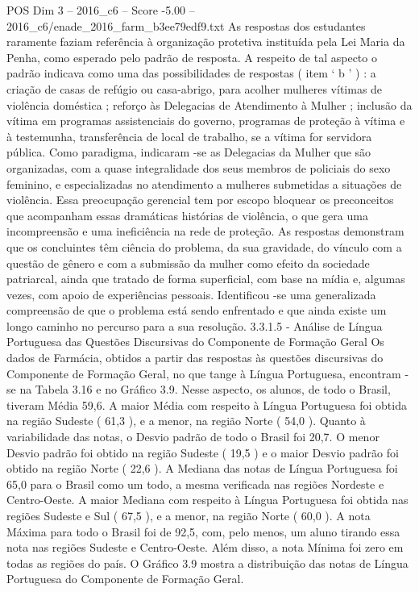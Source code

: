\begin{textsample}{POS Dim 3 – 2016\_c6 – Score -5.00 – 2016\_c6/enade\_2016\_farm\_b3ee79edf9.txt}
As respostas dos estudantes raramente faziam referência à organização protetiva instituída pela Lei Maria da Penha, como esperado pelo padrão de resposta.
A respeito de tal aspecto o padrão indicava como uma das possibilidades de respostas ( item ‘ b ’ ) : a criação de casas de refúgio ou casa-abrigo, para acolher mulheres vítimas de violência doméstica ; reforço às Delegacias de Atendimento à Mulher ; inclusão da vítima em programas assistenciais do governo, programas de proteção à vítima e à testemunha, transferência de local de trabalho, se a vítima for servidora pública.
Como paradigma, indicaram -se as Delegacias da Mulher que são organizadas, com a quase integralidade dos seus membros de policiais do sexo feminino, e especializadas no atendimento a mulheres submetidas a situações de violência.
Essa preocupação gerencial tem por escopo bloquear os preconceitos que acompanham essas dramáticas histórias de violência, o que gera uma incompreensão e uma ineficiência na rede de proteção.
As respostas demonstram que os concluintes têm ciência do problema, da sua gravidade, do vínculo com a questão de gênero e com a submissão da mulher como efeito da sociedade patriarcal, ainda que tratado de forma superficial, com base na mídia e, algumas vezes, com apoio de experiências pessoais.
Identificou -se uma generalizada compreensão de que o problema está sendo enfrentado e que ainda existe um longo caminho no percurso para a sua resolução. 3.3.1.5 - Análise de Língua Portuguesa das Questões Discursivas do Componente de Formação Geral Os dados de Farmácia, obtidos a partir das respostas às questões discursivas do Componente de Formação Geral, no que tange à Língua Portuguesa, encontram -se na Tabela 3.16 e no Gráfico 3.9.
Nesse aspecto, os alunos, de todo o Brasil, tiveram Média 59,6.
A maior Média com respeito à Língua Portuguesa foi obtida na região Sudeste ( 61,3 ), e a menor, na região Norte ( 54,0 ).
Quanto à variabilidade das notas, o Desvio padrão de todo o Brasil foi 20,7.
O menor Desvio padrão foi obtido na região Sudeste ( 19,5 ) e o maior Desvio padrão foi obtido na região Norte ( 22,6 ).
A Mediana das notas de Língua Portuguesa foi 65,0 para o Brasil como um todo, a mesma verificada nas regiões Nordeste e Centro-Oeste.
A maior Mediana com respeito à Língua Portuguesa foi obtida nas regiões Sudeste e Sul ( 67,5 ), e a menor, na região Norte ( 60,0 ).
A nota Máxima para todo o Brasil foi de 92,5, com, pelo menos, um aluno tirando essa nota nas regiões Sudeste e Centro-Oeste.
Além disso, a nota Mínima foi zero em todas as regiões do país.
O Gráfico 3.9 mostra a distribuição das notas de Língua Portuguesa do Componente de Formação Geral.

\end{textsample}
